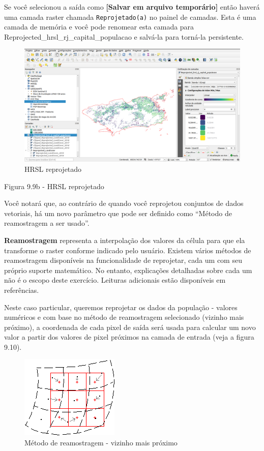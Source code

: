 \documentclass[
  portuguese,
]{krantz}
\begin{document}
Se você selecionou a saída como \textbf{{[}Salvar em arquivo temporário{]}} então haverá uma camada raster chamada \texttt{Reprojetado(a)} no painel de camadas. Esta é uma camada de memória e você pode renomear esta camada para Reprojected\_hrsl\_rj\_capital\_populacao e salvá-la para torná-la persistente.

\begin{figure}
\centering
\includegraphics{media/modulo9/fig99_b.png}
\caption{HRSL reprojetado}
\end{figure}

Figura 9.9b - HRSL reprojetado

Você notará que, ao contrário de quando você reprojetou conjuntos de dados vetoriais, há um novo parâmetro que pode ser definido como ``Método de reamostragem a ser usado''.

\textbf{Reamostragem} representa a interpolação dos valores da célula para que ela transforme o raster conforme indicado pelo usuário. Existem vários métodos de reamostragem disponíveis na funcionalidade de reprojetar, cada um com seu próprio suporte matemático. No entanto, explicações detalhadas sobre cada um não é o escopo deste exercício. Leituras adicionais estão disponíveis em referências.

Neste caso particular, queremos reprojetar os dados da população - valores numéricos e com base no método de reamostragem selecionado (vizinho mais próximo), a coordenada de cada pixel de saída será usada para calcular um novo valor a partir dos valores de pixel próximos na camada de entrada (veja a figura 9.10).

\begin{figure}
\centering
\includegraphics{media/modulo9/fig910.png}
\caption{Método de reamostragem - vizinho mais próximo}
\end{figure}
\end{document}
